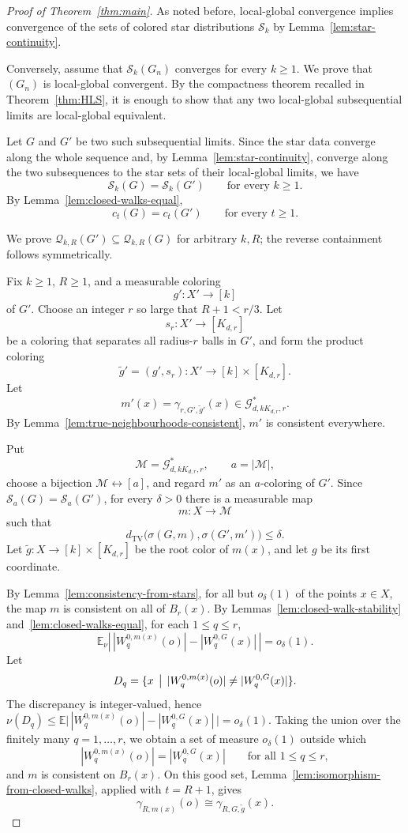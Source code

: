 \documentclass[10pt,a4paper]{amsart}
\newcommand{\E}{\mathbb E}
\newcommand{\TV}{\operatorname{TV}}
\newcommand{\calG}{\mathcal G}
\newcommand{\calQ}{\mathcal Q}
\newcommand{\calS}{\mathcal S}
\begin{document}
\begin{proof}[Proof of Theorem~\ref{thm:main}]
As noted before, local-global convergence implies convergence of the sets of colored star distributions $\calS_k$ by Lemma~\ref{lem:star-continuity}.

Conversely, assume that $\calS_k(G_n)$ converges for every $k\geq 1$.  We prove that $(G_n)$ is local-global convergent.  By the compactness theorem recalled in Theorem~\ref{thm:HLS}, it is enough to show that any two local-global subsequential limits are local-global equivalent.

Let $G$ and $G'$ be two such subsequential limits.  Since the star data converge along the whole sequence and, by Lemma~\ref{lem:star-continuity}, converge along the two subsequences to the star sets of their local-global limits, we have
\[
 \calS_k(G)=\calS_k(G')
 \qquad\text{for every }k\geq 1.
\]
By Lemma~\ref{lem:closed-walks-equal},
\[
 c_t(G)=c_t(G')
 \qquad\text{for every }t\geq 1.
\]

We prove $\calQ_{k,R}(G')\subseteq\calQ_{k,R}(G)$ for arbitrary $k,R$; the reverse containment follows symmetrically.

Fix $k\geq 1$, $R\geq 1$, and a measurable coloring
\[
 g'\colon X'\to[k]
\]
of $G'$.  Choose an integer $r$ so large that $R+1<r/3$.  Let
\[
 s_r\colon X'\to[K_{d,r}]
\]
be a coloring that separates all radius-$r$ balls in $G'$, and form the product coloring
\[
 \widetilde g'=(g',s_r)\colon X'\to[k]\times[K_{d,r}].
\]
Let
\[
 m'(x)=\gamma_{r,G',\widetilde g'}(x)
 \in\calG^*_{d,kK_{d,r},r}.
\]
By Lemma~\ref{lem:true-neighbourhoods-consistent}, $m'$ is consistent everywhere.

Put
\[
 \mathcal M=\calG^*_{d,kK_{d,r},r},\qquad a=|\mathcal M|,
\]
choose a bijection $\mathcal M\leftrightarrow[a]$, and regard $m'$ as an $a$-coloring of $G'$.  Since $\calS_a(G)=\calS_a(G')$, for every $\delta>0$ there is a measurable map
\[
 m\colon X\to\mathcal M
\]
such that
\[
 d_{\TV}\bigl(\sigma(G,m),\sigma(G',m')\bigr)\leq\delta.
\]
Let $\widetilde g\colon X\to[k]\times[K_{d,r}]$ be the root color of $m(x)$, and let $g$ be its first coordinate.

By Lemma~\ref{lem:consistency-from-stars}, for all but $o_\delta(1)$ of the points $x\in X$, the map $m$ is consistent on all of $B_r(x)$.  By Lemmas~\ref{lem:closed-walk-stability} and~\ref{lem:closed-walks-equal}, for each $1\leq q\leq r$,
\[
 \E_\nu\left|\,|W_q^{0,m(x)}(o)|-|W_q^{0,G}(x)|\,\right|=o_\delta(1).
\]
Let
\[
 D_q=\{x\,\bigm|\, |W_q^{0,m(x)}(o)|\neq |W_q^{0,G}(x)|\}.
\]
The discrepancy is integer-valued, hence $\nu(D_q)\leq \E  \bigl|\,|W_q^{0,m(x)}(o)|-|W_q^{0,G}(x)|\,\bigr|=o_\delta(1)$.  Taking the union over the finitely many $q=1,\ldots,r$, we obtain a set of measure $o_\delta(1)$ outside which
\[
 |W_q^{0,m(x)}(o)|=|W_q^{0,G}(x)|
 \qquad\text{for all }1\leq q\leq r,
\]
and $m$ is consistent on $B_r(x)$.  On this good set, Lemma~\ref{lem:isomorphism-from-closed-walks}, applied with $t=R+1$, gives
\[
 \gamma_{R,m(x)}(o)
 \cong
 \gamma_{R,G,\widetilde g}(x).
\]


\end{proof}
\end{document}
